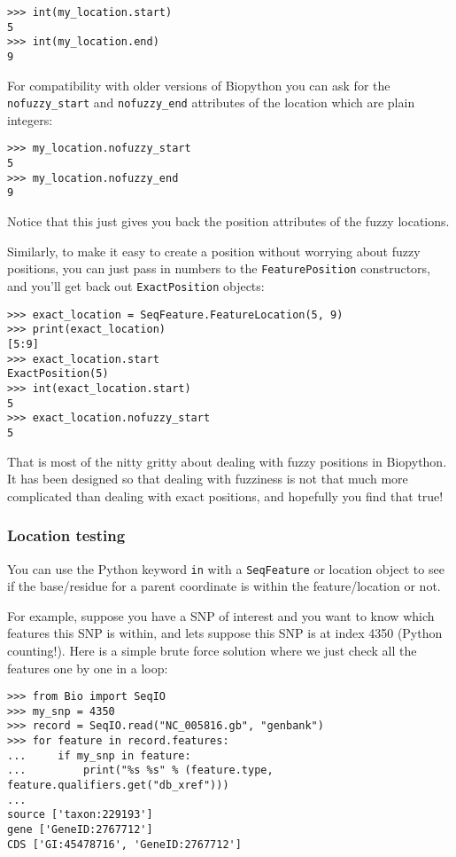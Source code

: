 \begin{verbatim}
>>> int(my_location.start)
5
>>> int(my_location.end)
9
\end{verbatim}

For compatibility with older versions of Biopython you can ask for the
\verb|nofuzzy_start| and \verb|nofuzzy_end| attributes of the location
which are plain integers:

\begin{verbatim}
>>> my_location.nofuzzy_start
5
>>> my_location.nofuzzy_end
9
\end{verbatim}

Notice that this just gives you back the position attributes of the fuzzy locations.

Similarly, to make it easy to create a position without worrying about fuzzy positions, you can just pass in numbers to the \verb|FeaturePosition| constructors, and you'll get back out \verb|ExactPosition| objects:

\begin{verbatim}
>>> exact_location = SeqFeature.FeatureLocation(5, 9)
>>> print(exact_location)
[5:9]
>>> exact_location.start
ExactPosition(5)
>>> int(exact_location.start)
5
>>> exact_location.nofuzzy_start
5
\end{verbatim}

That is most of the nitty gritty about dealing with fuzzy positions in Biopython.
It has been designed so that dealing with fuzziness is not that much more
complicated than dealing with exact positions, and hopefully you find that true!

\subsubsection{Location testing}

You can use the Python keyword \verb|in| with a \verb|SeqFeature| or location
object to see if the base/residue for a parent coordinate is within the
feature/location or not.

For example, suppose you have a SNP of interest and you want to know which
features this SNP is within, and lets suppose this SNP is at index 4350
(Python counting!). Here is a simple brute force solution where we just
check all the features one by one in a loop:

\begin{verbatim}
>>> from Bio import SeqIO
>>> my_snp = 4350
>>> record = SeqIO.read("NC_005816.gb", "genbank")
>>> for feature in record.features:
...     if my_snp in feature:
...         print("%s %s" % (feature.type, feature.qualifiers.get("db_xref")))
...
source ['taxon:229193']
gene ['GeneID:2767712']
CDS ['GI:45478716', 'GeneID:2767712']
\end{verbatim}

